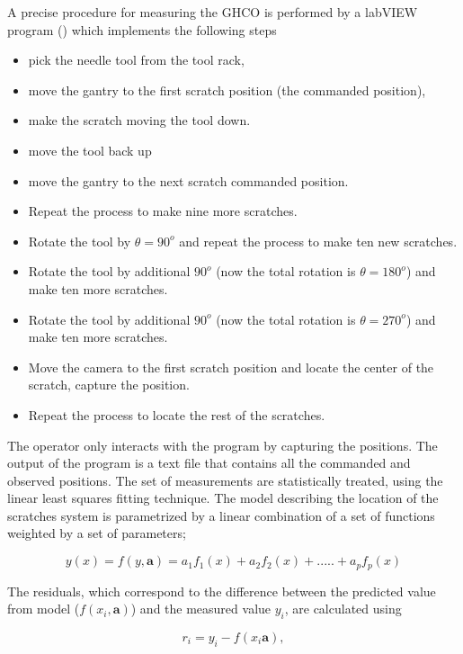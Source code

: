 A precise procedure for measuring the GHCO is performed by a labVIEW program () which implements the following steps 

\begin{itemize}
\item pick the needle tool from the tool rack,
\item move the gantry to the first scratch position (the commanded position),
\item make the scratch moving the tool down.
\item move the tool back up
\item move the gantry to the next scratch commanded position.
\item Repeat the process to make nine more scratches.
\item Rotate the tool by $\theta=90^o$ and repeat the process to make ten new scratches.
\item Rotate the tool by additional $90^o$ (now the total rotation is $\theta=180^o$) and make ten more scratches.
\item Rotate the tool by additional $90^o$ (now the total rotation is $\theta=270^o$) and make ten more scratches.
\item Move the camera to the first scratch position and locate the center of the scratch, capture the position.
\item Repeat the process to locate the rest of the scratches.   
\end{itemize}

The operator only interacts with the program by capturing the positions. The output of the program is a text file that contains all the commanded and observed positions. The set of measurements are statistically treated, using the linear least squares fitting technique. The model describing the location of the scratches system is parametrized by a linear combination of a set of functions weighted by a set of parameters;

\begin{equation}
y(x)= f(y,\textbf{a})=a_1f_1(x)+a_2f_2(x)+.....+a_pf_p(x)
\end{equation}

The residuals, which correspond to the difference between the predicted value from model ($f(x_i, \textbf{a})$) and the measured value $y_i$, are calculated using 

\begin{equation}
r_i= y_i - f(x_i\textbf{a}),
\end{equation}

